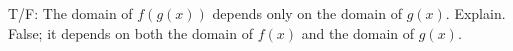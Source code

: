 {T/F: The domain of $f(g(x))$ depends only on the domain of $g(x)$. Explain.}
{False; it depends on both the domain of $f(x)$ and the domain of $g(x)$.}
